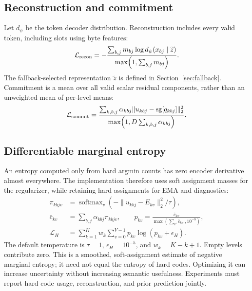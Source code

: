 \documentclass[11pt,a4paper]{article}
\begin{document}
\subsection{Reconstruction and commitment}
Let \(d_\psi\) be the token decoder distribution. Reconstruction includes every
valid token, including slots using byte features:
\begin{equation}
 \mathcal{L}_{\mathrm{recon}}=
 -\frac{\sum_{b,j}m_{bj}\log d_\psi(x_{bj}\mid\widetilde z)}
 {\max\!\left(1,\sum_{b,j}m_{bj}\right)}.
\end{equation}
The fallback-selected representation \(\widetilde z\) is defined in
Section~\ref{sec:fallback}. Commitment is a mean over all valid scalar
residual components, rather than an unweighted mean of per-level means:
\begin{equation}
 \mathcal{L}_{\mathrm{commit}}=
 \frac{\sum_{k,b,j}\alpha_{kbj}\|u_{kbj}-\operatorname{sg}[q_{kbj}]\|_2^2}
 {\max\!\left(1,D\sum_{k,b,j}\alpha_{kbj}\right)}.
\end{equation}

\subsection{Differentiable marginal entropy}
An entropy computed only from hard argmin counts has zero encoder derivative
almost everywhere. The implementation therefore uses soft assignment masses
for the regularizer, while retaining hard assignments for EMA and diagnostics:
\begin{align}
 \pi_{kbjv}&=\operatorname{softmax}_{v}
  \left(-\|u_{kbj}-E_{kv}\|_2^2/\tau\right),\\
 \bar c_{kv}&=\sum_{b,j}\alpha_{kbj}\pi_{kbjv},\qquad
 p_{kv}=\frac{\bar c_{kv}}{\max(\sum_{v'}\bar c_{kv'},10^{-8})},\\
 \mathcal{L}_H&=\sum_{k=1}^{K}w_k\sum_{v=0}^{V-1}
                  p_{kv}\log(p_{kv}+\epsilon_H).
\end{align}
The default temperature is \(\tau=1\), \(\epsilon_H=10^{-5}\), and
\(w_k=K-k+1\). Empty levels
contribute zero. This is a smoothed, soft-assignment estimate of negative
marginal entropy; it need not equal the entropy of hard codes. Optimizing it
can increase uncertainty without increasing semantic usefulness. Experiments
must report hard code usage, reconstruction, and prior prediction jointly.
\end{document}
